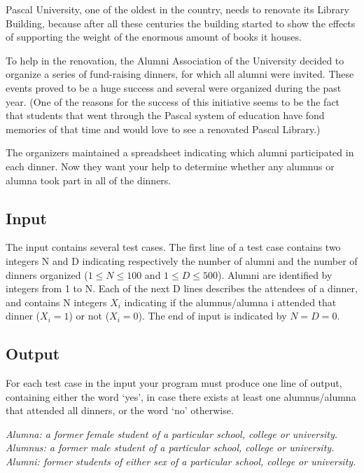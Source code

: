 Pascal University, one of the oldest in the country, needs to renovate its Library Building,
because after all these centuries the building started to show the effects of supporting the
weight of the enormous amount of books it houses.

To help in the renovation, the Alumni Association of the University decided to organize a
series of fund-raising dinners, for which all alumni were invited. These events proved to be
a huge success and several were organized during the past year. (One of the reasons for the
success of this initiative seems to be the fact that students that went through the Pascal system
of education have fond memories of that time and would love to see a renovated Pascal Library.)

The organizers maintained a spreadsheet indicating which alumni participated in each dinner. Now they want your help to determine whether any alumnus or alumna took part in all
of the dinners.

\subsection*{Input}

The input contains several test cases. The first line of a test case contains two integers N
and D indicating respectively the number of alumni and the number of dinners organized
($1 \le N \le 100$ and $1 \le D \le 500$). Alumni are identified by integers from 1 to N. Each of
the next D lines describes the attendees of a dinner, and contains N integers $X_i$
indicating if
the alumnus/alumna i attended that dinner ($X_i = 1$) or not ($X_i = 0$). The end of input is
indicated by $N = D = 0$.

\subsection*{Output}

For each test case in the input your program must produce one line of output, containing either
the word ‘yes’, in case there exists at least one alumnus/alumna that attended all dinners, or
the word ‘no’ otherwise.


\emph{Alumna: a former female student of a particular school, college or university. \\
Alumnus: a former male student of a particular school, college or university. \\
Alumni: former students of either sex of a particular school, college or university.}


